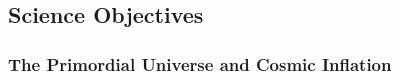 
\subsection{Science Objectives}
\label{sec:science}

\vspace{-0.05in}

 
\subsubsection{The Primordial Universe and Cosmic Inflation}

\vspace{-0.05in}


